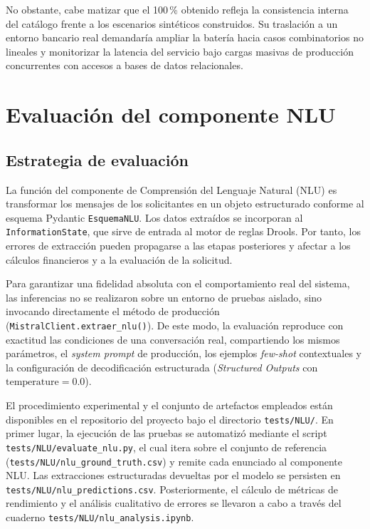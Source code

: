 \documentclass[12pt,a4paper]{report}
\begin{document}
No obstante, cabe matizar que el 100\,\% obtenido refleja la consistencia interna del catálogo frente a los escenarios sintéticos construidos. Su traslación a un entorno bancario real demandaría ampliar la batería hacia casos combinatorios no lineales y monitorizar la latencia del servicio bajo cargas masivas de producción concurrentes con accesos a bases de datos relacionales.






\section{Evaluación del componente NLU}

\subsection{Estrategia de evaluación}

La función del componente de Comprensión del Lenguaje Natural (NLU) es transformar los mensajes de los solicitantes en un objeto estructurado conforme al esquema Pydantic \texttt{EsquemaNLU}. Los datos extraídos se incorporan al \texttt{InformationState}, que sirve de entrada al motor de reglas Drools. Por tanto, los errores de extracción pueden propagarse a las etapas posteriores y afectar a los cálculos financieros y a la evaluación de la solicitud.

Para garantizar una fidelidad absoluta con el comportamiento real del sistema, las inferencias no se realizaron sobre un entorno de pruebas aislado, sino invocando directamente el método de producción (\texttt{MistralClient.extraer\_nlu()}). De este modo, la evaluación reproduce con exactitud las condiciones de una conversación real, compartiendo los mismos parámetros, el \textit{system prompt} de producción, los ejemplos \textit{few-shot} contextuales y la configuración de decodificación estructurada (\textit{Structured Outputs} con $\text{temperature} = 0.0$).

El procedimiento experimental y el conjunto de artefactos empleados están disponibles en el repositorio del proyecto bajo el directorio \texttt{tests/NLU/}. En primer lugar, la ejecución de las pruebas se automatizó mediante el script \texttt{tests/NLU/evaluate\_nlu.py}, el cual itera sobre el conjunto de referencia (\texttt{tests/NLU/nlu\_ground\_truth.csv}) y remite cada enunciado al componente NLU. Las extracciones estructuradas devueltas por el modelo se persisten en \texttt{tests/NLU/nlu\_predictions.csv}. Posteriormente, el cálculo de métricas de rendimiento y el análisis cualitativo de errores se llevaron a cabo a través del cuaderno \texttt{tests/NLU/nlu\_analysis.ipynb}.
\end{document}
